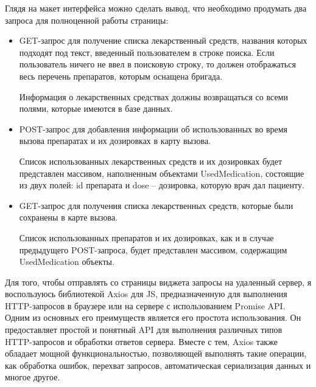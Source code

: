 Глядя на макет интерфейса можно сделать вывод, что необходимо продумать два запроса для полноценной работы страницы:
\begin{itemize}
    \item GET-запрос для получение списка лекарственный средств, названия которых подходят под текст, введенный пользователем в строке поиска. Если пользователь ничего не ввел в поисковую строку, то должен отображаться весь перечень препаратов, которым оснащена бригада.

    Информация о лекарственных средствах должны возвращаться со всеми полями, которые имеются в базе данных.

    \item POST-запрос для добавления информации об использованных во время вызова препаратах и их дозировках в карту вызова.

    Список использованных лекарственных средств и их дозировках будет представлен массивом, наполненным объектами UsedMedication, состоящие из двух полей: id препарата и dose -- дозировка, которую врач дал пациенту.
    
    \item GET-запрос для получения списка лекарственных средств, которые были сохранены в карте вызова.

    Список использованных препаратов и их дозировках, как и в случае предыдущего POST-запроса, будет представлен массивом, содержащим UsedMedication объекты.
    
\end{itemize}

Для того, чтобы отправлять со страницы виджета запросы на удаленный сервер, я воспользуюсь библиотекой Axios для JS, предназначенную для выполнения HTTP-запросов в браузере или на сервере с использованием Promise API. Одним из основных его преимуществ является его простота использования. Он предоставляет простой и понятный API для выполнения различных типов HTTP-запросов и обработки ответов сервера. Вместе с тем, Axios также обладает мощной функциональностью, позволяющей выполнять такие операции, как обработка ошибок, перехват запросов, автоматическая сериализация данных и многое другое.

